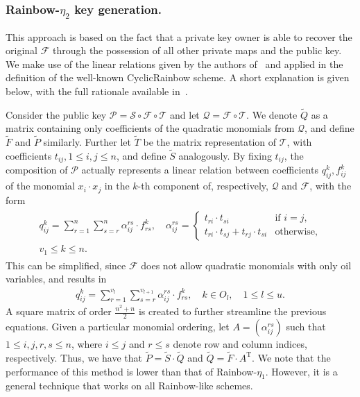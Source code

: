 \documentclass[draft, 12pt, a4paper, oneside]{memoir}
\theoremstyle{definition}
\begin{document}
\subsubsection{Rainbow-$\eta_{2}$ key generation.}

This approach is based on the fact that a private key owner is able to recover
the original $\mathcal{F}$ through the possession of all other private maps and
the public key. We make use of the linear relations given by the authors
of~\cite{Petzoldt:201006} and applied in the definition of the
well-known CyclicRainbow scheme. A short explanation is given below, with the
full rationale available in~\cite[Chapter 7]{Petzoldt:201307}.

Consider the public key
$\mathcal{P} = \mathcal{S} \circ \mathcal{F} \circ \mathcal{T}$ and let
$\mathcal{Q} = \mathcal{F} \circ \mathcal{T}$. We denote $\widetilde{Q}$ as a
matrix containing only coefficients of the quadratic monomials from
$\mathcal{Q}$, and define $\widetilde{F}$ and $\widetilde{P}$ similarly.
Further let $\widetilde{T}$ be the matrix representation of $\mathcal{T}$, with
coefficients $t_{ij}, 1 \leq i, j \leq n$, and define $\widetilde{S}$
analogously. By fixing $t_{ij}$, the composition of $\mathcal{P}$ actually
represents a linear relation between coefficients $q_{ij}^{k}, f_{ij}^{k}$ of
the monomial $x_{i} \cdot x_{j}$ in the $k$-th component of, respectively,
$\mathcal{Q}$ and $\mathcal{F}$, with the form
\begin{align}
  \begin{split}
    q_{ij}^{k} = \sum_{r = 1}^{n} \sum_{s = r}^{n}
      \alpha_{ij}^{rs} \cdot f_{rs}^{k}, \quad
      \alpha_{ij}^{rs} = \begin{cases}
        t_{ri} \cdot t_{si}                         & \text{if } i = j, \\
        t_{ri} \cdot t_{sj} + t_{rj} \cdot t_{si}   & \text{otherwise},
      \end{cases} \\
      v_{1} \leq k \leq n.
  \end{split}
\end{align}
This can be simplified, since $\mathcal{F}$ does not allow quadratic monomials
with only oil variables, and results in
\begin{align}
  q_{ij}^{k} = \sum_{r = 1}^{v_{l}} \sum_{s = r}^{v_{l + 1}}
    \alpha_{ij}^{rs} \cdot f_{rs}^{k},
      \quad k \in O_{l}, \quad 1 \leq l \leq u.
\end{align}
A square matrix of order $\frac{n^{2} + n}{2}$ is created to further streamline
the previous equations. Given a particular monomial ordering, let
$A = (\alpha_{ij}^{rs})$ such that $1 \leq i, j, r, s \leq n$, where
$i \leq j$ and $r \leq s$ denote row and column indices, respectively. Thus, we
have that $\widetilde{P} = \widetilde{S} \cdot \widetilde{Q}$ and
$\widetilde{Q} = \widetilde{F} \cdot A^{\text{T}}$. We note that the
performance of this method is lower than that of Rainbow-$\eta_{1}$. However,
it is a general technique that works on all Rainbow-like schemes.
\end{document}
